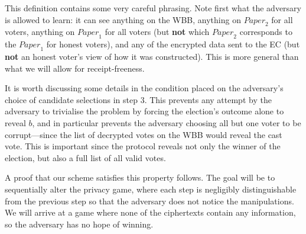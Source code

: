 \documentclass[12pt,a4paper]{article}
\theoremstyle{definition}
\newcommand{\Paper}{\mathit{Paper}}
\begin{document}
This definition contains some very careful phrasing. Note first what the adversary is allowed to learn: it can see anything on the WBB, anything on $\Paper_2$ for all voters, anything on $\Paper_1$ for all voters (but \textbf{not} which $\Paper_2$ corresponds to the $\Paper_1$ for honest voters), and any of the encrypted data sent to the EC (but \textbf{not} an honest voter's view of how it was constructed). This is more general than what we will allow for receipt-freeness.

It is worth discussing some details in the condition placed on the adversary's choice of candidate selections in step 3. This prevents any attempt by the adversary to trivialise the problem by forcing the election's outcome alone to reveal $b$, and in particular prevents the adversary choosing all but one voter to be corrupt---since the list of decrypted votes on the WBB would reveal the cast vote. This is important since the protocol reveals not only the winner of the election, but also a full list of all valid votes.

A proof that our scheme satisfies this property follows. The goal will be to sequentially alter the privacy game, where each step is negligibly distinguishable from the previous step so that the adversary does not notice the manipulations. We will arrive at a game where none of the ciphertexts contain any information, so the adversary has no hope of winning.
\end{document}
